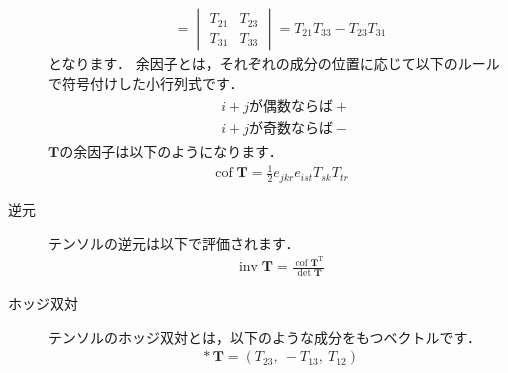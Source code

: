\begin{description}
\begin{align}
             = \begin{vmatrix}
                T_{21} & T_{23} \\
                T_{31} & T_{33}
               \end{vmatrix}
             = T_{21}T_{33} - T_{23}T_{31}
            \end{align}
            となります．
%
            余因子とは，それぞれの成分の位置に応じて以下のルールで符号付けした小行列式です．
            \begin{align}
             \label{eq:1.37}
             \begin{aligned}
              &\text{$i + j$が偶数ならば$+$} \\
              &\text{$i + j$が奇数ならば$-$}
             \end{aligned}
            \end{align}
            $\bm{T}$の余因子は以下のようになります．
            \begin{align}
             \label{eq:1.38}
             \mathop{\mathrm{cof}}\bm{T} = \frac{1}{2}e_{jkr}e_{ist}T_{sk}T_{tr}
            \end{align}
%
 \item[逆元] テンソルの逆元は以下で評価されます．
            \begin{align}
             \label{eq:1.39}
             \mathop{\mathrm{inv}}\bm{T}
             = \frac{\mathop{\mathrm{cof}}\bm{T}^{\mathrm{T}}}{\det\bm{T}}
            \end{align}
%
 \item[ホッジ双対] テンソルのホッジ双対とは，以下のような成分をもつベクトルです．
            \begin{align}
             \label{eq:1.40}
             \mathop{*}\bm{T} = (T_{23},\ -T_{13},\ T_{12})
            \end{align}
\end{description}


